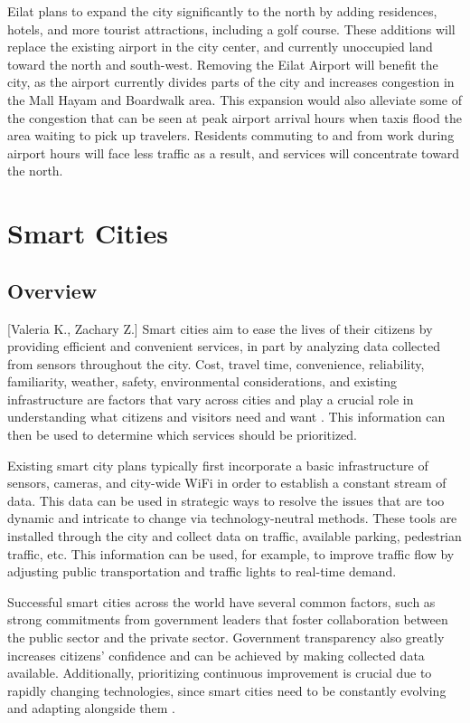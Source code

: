 \documentclass[12pt]{article}                               %
\begin{document}
Eilat plans to expand the city significantly to the north by adding residences, hotels, and more tourist attractions, including a golf course. These additions will replace the existing airport in the city center, and currently unoccupied land toward the north and south-west. Removing the Eilat Airport will benefit the city, as the airport currently divides parts of the city and increases congestion in the Mall Hayam and Boardwalk area. This expansion would also alleviate some of the congestion that can be seen at peak airport arrival hours when taxis flood the area waiting to pick up travelers. Residents commuting to and from work during airport hours will face less traffic as a result, and services will concentrate toward the north. 

\newpage
\section{Smart Cities}\label{sec:smart_cities}
\subsection{Overview}[Valeria K., Zachary Z.]
Smart cities aim  to ease the lives of their citizens by providing efficient and convenient services, in part by analyzing data collected from sensors throughout the city. Cost, travel time, convenience, reliability, familiarity, weather, safety, environmental considerations, and existing infrastructure are factors that vary across cities and play a crucial role in understanding what citizens and visitors need and want \cite{CityofAustin2016}. This information can then be used to determine which services should be prioritized.

Existing smart city plans typically first incorporate a basic infrastructure of sensors, cameras, and city-wide WiFi in order to establish a constant stream of data. This data can be used in strategic ways to resolve the issues that are too dynamic and intricate to change via technology-neutral methods. These tools are installed through the city and collect data on traffic, available parking, pedestrian traffic, etc. This information can be used, for example, to improve traffic flow by adjusting public transportation and traffic lights to real-time demand.

Successful smart cities across the world have several common factors, such as strong commitments from government leaders that foster collaboration between the public sector and the private sector. Government transparency also greatly increases citizens' confidence and can be achieved by making collected data available. Additionally, prioritizing continuous improvement is crucial due to rapidly changing technologies, since smart cities need to be constantly evolving and adapting alongside them \cite{Zanghi2017WhyExamples}. 
\end{document}

